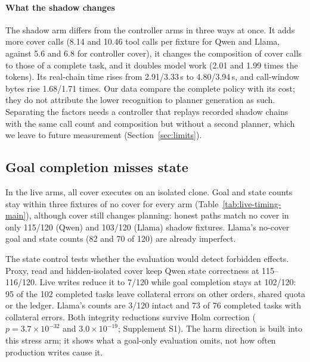\paragraph{What the shadow changes}
The shadow arm differs from the controller arms in three ways at once. It adds more cover calls (8.14 and 10.46 tool calls per fixture for Qwen and Llama, against 5.6 and 6.8 for controller cover), it changes the composition of cover calls to those of a complete task, and it doubles model work (2.01 and 1.99 times the tokens). Its real-chain time rises from 2.91/3.33\,s to 4.80/3.94\,s, and call-window bytes rise 1.68/1.71 times. Our data compare the complete policy with its cost; they do not attribute the lower recognition to planner generation as such. Separating the factors needs a controller that replays recorded shadow chains with the same call count and composition but without a second planner, which we leave to future measurement (Section~\ref{sec:limits}).

\subsection{Goal completion misses state}\label{sec:state}
In the live arms, all cover executes on an isolated clone. Goal and state counts stay within three fixtures of no cover for every arm (Table~\ref{tab:live-timing-main}), although cover still changes planning: honest paths match no cover in only 115/120 (Qwen) and 103/120 (Llama) shadow fixtures. Llama's no-cover goal and state counts (82 and 70 of 120) are already imperfect.

The state control tests whether the evaluation would detect forbidden effects. Proxy, read and hidden-isolated cover keep Qwen state correctness at 115--116/120. Live writes reduce it to 7/120 while goal completion stays at 102/120: 95 of the 102 completed tasks leave collateral errors on other orders, shared quota or the ledger. Llama's counts are 3/120 intact and 73 of 76 completed tasks with collateral errors. Both integrity reductions survive Holm correction ($p=3.7\times10^{-32}$ and $3.0\times10^{-19}$; Supplement S1). The harm direction is built into this stress arm; it shows what a goal-only evaluation omits, not how often production writes cause it.

